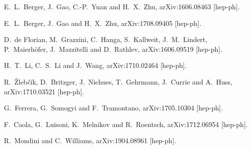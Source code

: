  E.~L.~Berger, J.~Gao, C.-P.~Yuan and H.~X.~Zhu,
  arXiv:1606.08463 [hep-ph].

  E.~L.~Berger, J.~Gao and H.~X.~Zhu,
  arXiv:1708.09405 [hep-ph].


  D.~de Florian, M.~Grazzini, C.~Hanga, S.~Kallweit, J.~M.~Lindert, P.~Maierhöfer, J.~Mazzitelli and D.~Rathlev,
  arXiv:1606.09519 [hep-ph].


  H.~T.~Li, C.~S.~Li and J.~Wang,
  arXiv:1710.02464 [hep-ph].

  R.~Žlebčík, D.~Britzger, J.~Niehues, T.~Gehrmann, J.~Currie and A.~Huss,
  arXiv:1710.03521 [hep-ph].

  G.~Ferrera, G.~Somogyi and F.~Tramontano,
  arXiv:1705.10304 [hep-ph].

  F.~Caola, G.~Luisoni, K.~Melnikov and R.~Roentsch,
  arXiv:1712.06954 [hep-ph].

  R.~Mondini and C.~Williams,
  arXiv:1904.08961 [hep-ph].

